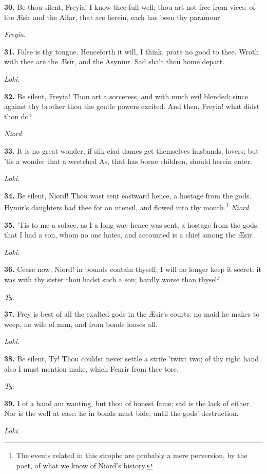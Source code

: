 \textbf{30.} Be thou silent, Freyia! I know thee full well; thou art not free
from vices: of the Æsir and the Alfar, that are herein, each has been
thy paramour.

\emph{Freyia}.

\textbf{31.} False is thy tongue. Henceforth it will, I think, prate no good
to thee. Wroth with thee are the Æsir, and the Asyniur. Sad shalt thou
home depart.

\emph{Loki}.

\textbf{32.} Be silent, Freyia! Thou art a sorceress, and with much evil
blended; since against thy brother thou the gentle powers excited. And
then, Freyia! what didst thou do?

\emph{Niord}.

\textbf{33.} It is no great wonder, if silk-clad dames get themselves
husbands, lovers; but 'tis a wonder that a wretched As, that has borne
children, should herein enter.

\emph{Loki}.

\textbf{34.} Be silent, Niord! Thou wast sent eastward hence, a hostage from
the gods. Hymir's daughters had thee for an utensil, and flowed into
thy mouth.\footnote{The events related in this strophe are probably a mere
perversion, by the poet, of what we know of Niord's history.} \emph{Niord}.

\textbf{35.} 'Tis to me a solace, as I a long way hence was sent, a hostage
from the gods, that I had a son, whom no one hates, and accounted is a
chief among the Æsir.

\emph{Loki}.

\textbf{36.} Cease now, Niord! in bounds contain thyself; I will no longer
keep it secret: it was with thy sister thou hadst such a son; hardly
worse than thyself.

\emph{Ty}.

\textbf{37.} Frey is best of all the exalted gods in the Æsir's courts: no
maid he makes to weep, no wife of man, and from bonds looses all.

\emph{Loki}.

\textbf{38.} Be silent, Ty! Thou couldst never settle a strife 'twixt two; of
thy right hand also I must mention make, which Fenrir from thee tore.

\emph{Ty}.

\textbf{39.} I of a hand am wanting, but thou of honest fame; sad is the lack
of either. Nor is the wolf at ease: he in bonds must bide, until the
gods' destruction.

\emph{Loki}.

